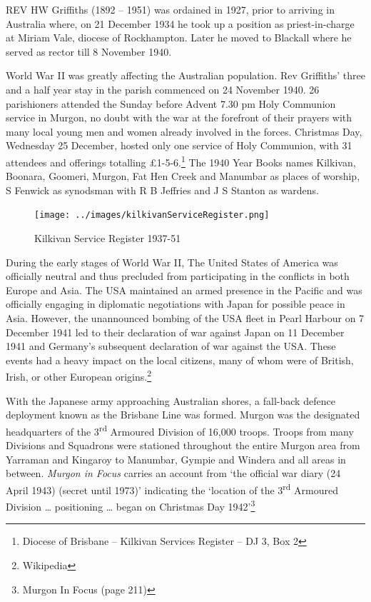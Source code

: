 \lettrine[lines=3]{R}{EV}
 HW Griffiths (1892 -- 1951) was ordained in 1927, prior to arriving in Australia where, on 21 December 1934 he took up a position as priest-in-charge at Miriam Vale, diocese of Rockhampton. Later he moved to Blackall where he served as rector till 8 November 1940.

World War II was greatly affecting the Australian population. Rev Griffiths' three and a half year stay in the parish commenced on 24 November 1940. 26 parishioners attended the Sunday before Advent 7.30 pm Holy Communion service in Murgon, no doubt with the war at the forefront of their prayers with many local young men and women already involved in the forces. Christmas Day, Wednesday 25 December, hosted only one service of Holy Communion, with 31 attendees and offerings totalling \pounds1-5-6.\footnote{Diocese of Brisbane -- Kilkivan Services Register -- DJ 3, Box 2} The 1940 Year Books names Kilkivan, Boonara, Goomeri, Murgon, Fat Hen Creek and Manumbar as places of worship, S Fenwick as synodsman with R B Jeffries and J S Stanton as wardens.








\begin{figure}
\begin{center}
\texttt{[image: ../images/kilkivanServiceRegister.png]}
\caption{Kilkivan Service Register 1937-51}
\end{center}
\end{figure}




During the early stages of World War II, The United States of America was officially neutral and thus precluded from participating in the conflicts in both Europe and Asia. The USA maintained an armed presence in the Pacific and was officially engaging in diplomatic negotiations with Japan for possible peace in Asia. However, the unannounced bombing of the USA fleet in Pearl Harbour on 7 December 1941 led to their declaration of war against Japan on 11 December 1941 and Germany's subsequent declaration of war against the USA. These events had a heavy impact on the local citizens, many of whom were of British, Irish, or other European origins.\footnote{Wikipedia}


With the Japanese army approaching Australian shores, a fall-back defence deployment known as the Brisbane Line was formed. Murgon was the designated headquarters of the 3\textsuperscript{rd} Armoured Division of 16,000 troops. Troops from many Divisions and Squadrons were stationed throughout the entire Murgon area from Yarraman and Kingaroy to Manumbar, Gympie and Windera and all areas in between. \emph{Murgon in Focus} carries an account from `the official war diary (24 April 1943) (secret until 1973)' indicating the `location of the 3\textsuperscript{rd} Armoured Division \ldots{} positioning \ldots{} began on Christmas Day 1942'\footnote{Murgon In Focus (page 211)}


